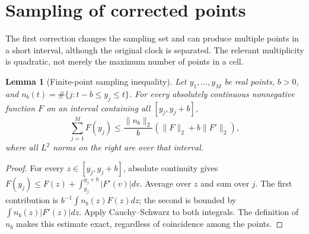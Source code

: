 \documentclass[11pt,reqno]{amsart}
\numberwithin{equation}{section}
\newtheorem{lemma}[theorem]{Lemma}
\begin{document}
\section{Sampling of corrected points}\label{sec:sampling}
The first correction changes the sampling set and can produce
multiple points in a short interval, although the original clock is
separated.  The relevant multiplicity is quadratic, not merely the
maximum number of points in a cell.

\begin{lemma}[Finite-point sampling inequality]\label{lem:abstractsampling}
Let $y_1,\ldots,y_M$ be real points, $b>0$, and
$n_b(t)=\#\{j:t-b\le y_j\le t\}$.  For every absolutely
continuous nonnegative function $F$ on an interval containing
all $[y_j,y_j+b]$,
\begin{equation}\label{eq:abssampling}
\sum_{j=1}^MF(y_j)
\le\frac{\|n_b\|_2}{b}
\left(\|F\|_2+b\|F'\|_2\right),
\end{equation}
where all $L^2$ norms on the right are over that interval.
\end{lemma}
\begin{proof}
For every $z\in[y_j,y_j+b]$, absolute continuity gives
$F(y_j)\le F(z)+\int_{y_j}^{y_j+b}|F'(v)|dv$.
Average over $z$ and sum over $j$.  The first contribution is
$b^{-1}\int n_b(z)F(z)dz$; the second is bounded by
$\int n_b(z)|F'(z)|dz$.  Apply Cauchy--Schwarz to both
integrals.  The definition of $n_b$ makes this estimate exact,
regardless of coincidence among the points.
\end{proof}
\end{document}
